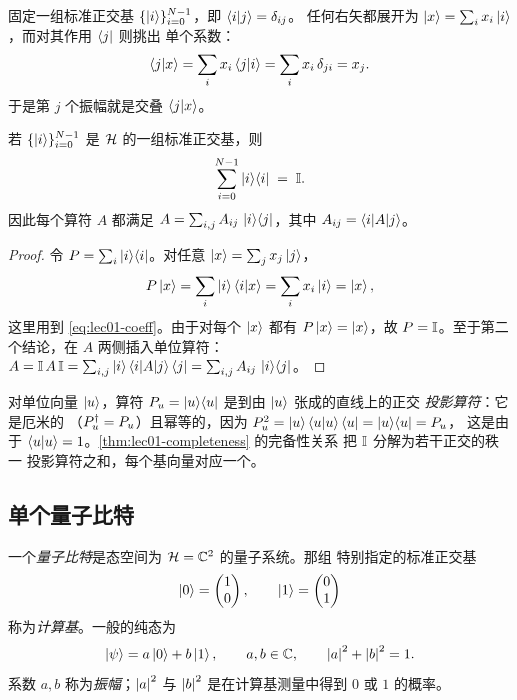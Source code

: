固定一组标准正交基 $\{\ket{i}\}_{i=0}^{N-1}$，即 $\braket{i|j}=\delta_{ij}$。
任何右矢都展开为 $\ket{x}=\sum_i x_i\ket{i}$，而对其作用 $\bra{j}$ 则挑出
单个系数：
\begin{equation}\label{eq:lec01-coeff}
  \braket{j|x}=\sum_i x_i\braket{j|i}=\sum_i x_i\,\delta_{ji}=x_j .
\end{equation}
于是第 $j$ 个振幅就是交叠 $\braket{j|x}$。

\begin{theorem}\label{thm:lec01-completeness}
若 $\{\ket{i}\}_{i=0}^{N-1}$ 是 $\mathcal{H}$ 的一组标准正交基，则
\begin{equation}
  \sum_{i=0}^{N-1}\ket{i}\!\bra{i}\;=\;\mathbb{I} .
\end{equation}
因此每个算符 $A$ 都满足 $A=\sum_{i,j}A_{ij}\,\ket{i}\!\bra{j}$，其中
$A_{ij}=\braket{i|A|j}$。
\end{theorem}

\begin{proof}
令 $P=\sum_i\ket{i}\!\bra{i}$。对任意 $\ket{x}=\sum_j x_j\ket{j}$，
\[
  P\ket{x}=\sum_i\ket{i}\braket{i|x}=\sum_i x_i\ket{i}=\ket{x},
\]
这里用到 \eqref{eq:lec01-coeff}。由于对每个 $\ket{x}$ 都有 $P\ket{x}=\ket{x}$，故
$P=\mathbb{I}$。至于第二个结论，在 $A$ 两侧插入单位算符：
$A=\mathbb{I}\,A\,\mathbb{I}=\sum_{i,j}\ket{i}\braket{i|A|j}\bra{j}=\sum_{i,j}A_{ij}\,\ket{i}\!\bra{j}$。
\end{proof}

\begin{remark}[投影算符]
对单位向量 $\ket{u}$，算符 $P_u=\ket{u}\!\bra{u}$ 是到由 $\ket{u}$ 张成的直线上的正交
\emph{投影算符}：它是厄米的
（$P_u^{\dagger}=P_u$）且幂等的，因为 $P_u^{2}=\ket{u}\braket{u|u}\bra{u}=\ket{u}\!\bra{u}=P_u$，
这是由于 $\braket{u|u}=1$。\cref{thm:lec01-completeness} 的完备性关系
把 $\mathbb{I}$ 分解为若干正交的秩一
投影算符之和，每个基向量对应一个。
\end{remark}

\subsection{单个量子比特}

\begin{definition}[量子比特与计算基]\label{def:lec01-qubit}
一个\emph{量子比特}是态空间为 $\mathcal{H}=\mathbb{C}^{2}$ 的量子系统。那组
特别指定的标准正交基
\[
  \ket{0}=\begin{pmatrix}1\\0\end{pmatrix},\qquad
  \ket{1}=\begin{pmatrix}0\\1\end{pmatrix}
\]
称为\emph{计算基}。一般的纯态为
\begin{equation}\label{eq:lec01-qubit}
  \ket{\psi}=a\ket{0}+b\ket{1},\qquad a,b\in\mathbb{C},\qquad \left\lvert a \right\rvert^{2}+\left\lvert b \right\rvert^{2}=1 .
\end{equation}
系数 $a,b$ 称为\emph{振幅}；$\left\lvert a \right\rvert^{2}$ 与 $\left\lvert b \right\rvert^{2}$
是在计算基测量中得到 $0$ 或 $1$ 的概率。
\end{definition}

